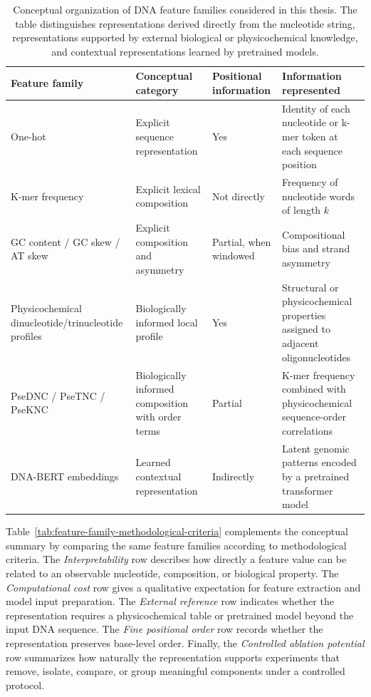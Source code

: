 \begin{table}[H]
\centering
\scriptsize
\setlength{\tabcolsep}{3pt}
\caption{Conceptual organization of DNA feature families considered in this thesis. The table distinguishes representations derived directly from the nucleotide string, representations supported by external biological or physicochemical knowledge, and contextual representations learned by pretrained models.}
\label{tab:feature-family-conceptual-summary}
\begin{tabular}{p{}p{}p{}p{}}
\toprule
Feature family & Conceptual category & Positional information & Information represented \\
\midrule
One-hot & Explicit sequence representation & Yes & Identity of each nucleotide or k-mer token at each sequence position \\
K-mer frequency & Explicit lexical composition & Not directly & Frequency of nucleotide words of length $k$ \\
GC content / GC skew / AT skew & Explicit composition and asymmetry & Partial, when windowed & Compositional bias and strand asymmetry \\
Physicochemical dinucleotide/trinucleotide profiles & Biologically informed local profile & Yes & Structural or physicochemical properties assigned to adjacent oligonucleotides \\
PseDNC / PseTNC / PseKNC & Biologically informed composition with order terms & Partial & K-mer frequency combined with physicochemical sequence-order correlations \\
DNA-BERT embeddings & Learned contextual representation & Indirectly & Latent genomic patterns encoded by a pretrained transformer model \\
\bottomrule
\end{tabular}
\end{table}

Table~\ref{tab:feature-family-methodological-criteria} complements the conceptual summary by comparing the same feature families according to methodological criteria. The \emph{Interpretability} row describes how directly a feature value can be related to an observable nucleotide, composition, or biological property. The \emph{Computational cost} row gives a qualitative expectation for feature extraction and model input preparation. The \emph{External reference} row indicates whether the representation requires a physicochemical table or pretrained model beyond the input DNA sequence. The \emph{Fine positional order} row records whether the representation preserves base-level order. Finally, the \emph{Controlled ablation potential} row summarizes how naturally the representation supports experiments that remove, isolate, compare, or group meaningful components under a controlled protocol.


